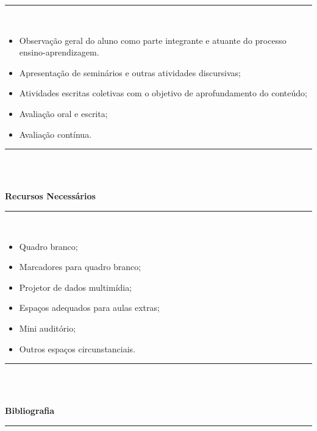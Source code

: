 \noindent\rule{16.5cm}{0.4pt}
\\
\begin{itemize}
\item Observação geral do aluno como parte integrante e atuante do processo ensino-aprendizagem.
\item Apresentação de seminários e outras atividades discursivas;
\item Atividades escritas coletivas com o objetivo de aprofundamento do conteúdo;
\item Avaliação oral e escrita;
\item Avaliação contínua.
\end{itemize}
\noindent\rule{16.5cm}{0.4pt}\\
\\
\vspace{-12mm}
\begin{center}\textbf{Recursos Necessários}\end{center}
\vspace{-5mm}
\noindent\rule{16.5cm}{0.4pt}
\\
\begin{itemize} 	
  \item Quadro branco;
  \item Marcadores para quadro branco;
  \item Projetor de dados multimídia;
  \item Espaços adequados para aulas extras;
  \item Mini auditório;
  \item Outros espaços circunstanciais.
\end{itemize}
\noindent\rule{16.5cm}{0.4pt}\\
\\
\vspace{-12mm}
\begin{center}\textbf{Bibliografia}\end{center}
\vspace{-5mm}
\noindent\rule{16.5cm}{0.4pt}
\\
